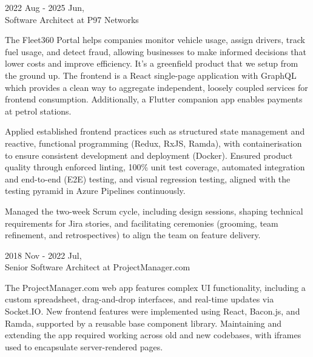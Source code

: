 \begin{resume}
\begin{minipage}{\textwidth}
\vspace{0.03in}
\hspace*{-0.25in} 2022 Aug - 2025 Jun,\\
\hspace*{-0.25in} Software Architect at P97 Networks
\vspace{0.165in}

The Fleet360 Portal helps companies monitor vehicle usage, assign drivers, track fuel usage, and detect fraud, allowing businesses to make informed decisions that lower costs and improve efficiency. It's a greenfield product that we setup from the ground up. The frontend is a React single-page application with GraphQL which provides a clean way to aggregate independent, loosely coupled services for frontend consumption. Additionally, a Flutter companion app enables payments at petrol stations.
\end{minipage}

Applied established frontend practices such as structured state management and reactive, functional programming (Redux, RxJS, Ramda), with containerisation to ensure consistent development and deployment (Docker). Ensured product quality through enforced linting, 100\% unit test coverage, automated integration and end-to-end (E2E) testing, and visual regression testing, aligned with the testing pyramid in Azure Pipelines continuously.

Managed the two-week Scrum cycle, including design sessions, shaping technical requirements for Jira stories, and facilitating ceremonies (grooming, team refinement, and retrospectives) to align the team on feature delivery.

\begin{minipage}{\textwidth}
\vspace{0.03in}
\hspace*{-0.25in} 2018 Nov - 2022 Jul,\\
\hspace*{-0.25in} Senior Software Architect at ProjectManager.com
\vspace{0.165in}

The ProjectManager.com web app features complex UI functionality, including a custom spreadsheet, drag-and-drop interfaces, and real-time updates via Socket.IO. New frontend features were implemented using React, Bacon.js, and Ramda, supported by a reusable base component library. Maintaining and extending the app required working across old and new codebases, with iframes used to encapsulate server-rendered pages.
\end{minipage}


\end{resume}
